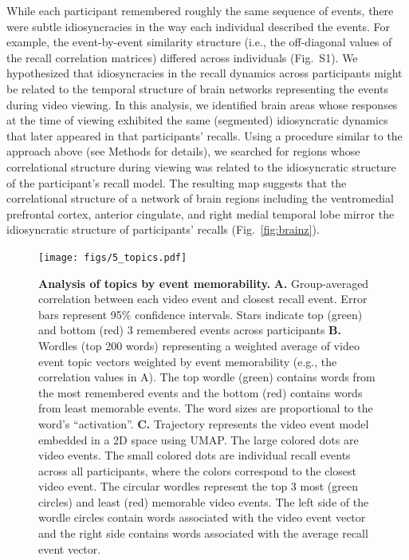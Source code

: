 \documentclass{article}
\begin{document}
While each participant remembered roughly the same sequence of events, there were subtle idiosyncracies in the way each individual described the events. For example, the event-by-event similarity structure (i.e., the off-diagonal values of the recall correlation matrices) differed across individuals (Fig.~S1). We hypothesized that idiosyncracies in the recall dynamics across participants might be related to the temporal structure of brain networks representing the events during video viewing. In this analysis, we identified brain areas whose responses at the time of viewing exhibited the same (segmented) idiosyncratic dynamics that later appeared in that participants’ recalls. Using a procedure similar to the approach above (see Methods for details), we searched for regions whose correlational structure during viewing was related to the idiosyncratic structure of the participant's recall model. The resulting map suggests that the correlational structure of a network of brain regions including the ventromedial prefrontal cortex, anterior cingulate, and right medial temporal lobe mirror the idiosyncratic structure of participants' recalls (Fig.~\ref{fig:brainz}).

\begin{figure}[tp]
\centering
\texttt{[image: figs/5\_topics.pdf]}
\caption{\small \textbf{Analysis of topics by event memorability.} \textbf{A.} Group-averaged correlation between each video event and closest recall event. Error bars represent 95\% confidence intervals. Stars indicate top (green) and bottom (red) 3 remembered events across participants \textbf{B.} Wordles (top 200 words) representing a weighted average of video event topic vectors weighted by event memorability (e.g., the correlation values in A). The top wordle (green) contains words from the most remembered events and the bottom (red) contains words from least memorable events. The word sizes are proportional to the word's ``activation''. \textbf{C.} Trajectory represents the video event model embedded in a 2D space using UMAP. The large colored dots are video events. The small colored dots are individual recall events across all participants, where the colors correspond to the closest video event. The circular wordles represent the top 3 most (green circles) and least (red) memorable video events.  The left side of the wordle circles contain words associated with the video event vector and the right side contains words associated with the average recall event vector.}
\label{fig:topics}
\end{figure}
\end{document}
